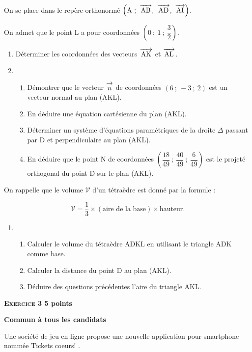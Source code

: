 \documentclass[11pt]{article}
\newcommand{\vect}[1]{\overrightarrow{\,\mathstrut#1\,}}
\begin{document}
\bigskip

On se place dans le repère orthonormé $\left(\text{A}~;~\vect{\text{AB}},~\vect{\text{AD}},~\vect{\text{AI}}\right)$. 

On admet que le point L a pour coordonnées $\left(0~;~1~;~\dfrac{3}{2}\right)$.

\medskip

\begin{enumerate}
\item Déterminer les coordonnées des vecteurs $\vect{\text{AK}}$ et $\vect{\text{AL}}$.
\item  
	\begin{enumerate}
		\item Démontrer que le vecteur $\vect{n}$ de coordonnées $(6~;~-3~;~2)$ est un vecteur normal au plan (AKL).
		\item En déduire une équation cartésienne du plan (AKL).
		\item Déterminer un système d'équations paramétriques de la droite $\Delta$ passant par D et
perpendiculaire au plan (AKL).
		\item En déduire que le point N de coordonnées $\left(\dfrac{18}{49}~;~\dfrac{40}{49}~;~\dfrac{6}{49}\right)$ est le projeté orthogonal du point D sur le plan (AKL).
	\end{enumerate}
\end{enumerate}

On rappelle que le volume $\mathcal{V}$ d'un tétraèdre est donné par la formule : 

\[\mathcal{V} = \dfrac{1}{3}\times  (\text{aire de la base}) \times \text{hauteur}.\]

\begin{enumerate}[resume]
\item 
	\begin{enumerate}
		\item Calculer le volume du tétraèdre ADKL en utilisant le triangle ADK comme base. 
		\item Calculer la distance du point D au plan (AKL).
		\item Déduire des questions précédentes l'aire du triangle AKL.
	\end{enumerate}
\end{enumerate}

\bigskip

\textbf{\textsc{Exercice 3} \hfill 5 points}

\textbf{Commun à tous les candidats}

\medskip
Une société de jeu en ligne propose une nouvelle application pour smartphone nommée \og Tickets coeurs! \fg.
\end{document}
